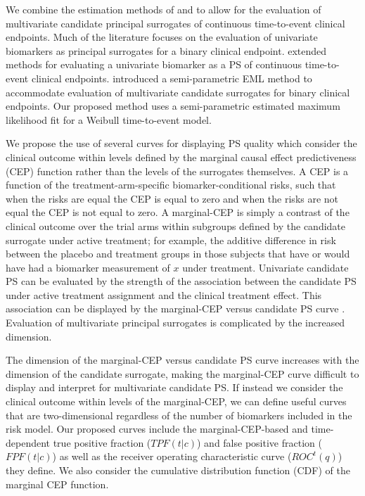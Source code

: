 \documentclass[times, doublespace]{simauth}
\begin{document}
We combine the estimation methods of \citet{Gabriel13} and  \citet{Huang11}  to allow for the evaluation of multivariate candidate principal surrogates of continuous time-to-event clinical endpoints. Much of the literature focuses on the evaluation of univariate biomarkers as principal surrogates for a binary clinical endpoint. \citet{Gabriel13} extended methods for evaluating a univariate biomarker as a PS of continuous time-to-event clinical endpoints. \citet{Huang11} introduced a semi-parametric EML method to accommodate evaluation of multivariate candidate surrogates for binary clinical endpoints.  Our proposed method uses a semi-parametric estimated maximum likelihood fit for a Weibull time-to-event model. 

We propose the use of several curves for displaying PS quality which consider the clinical outcome within levels defined by the marginal causal effect predictiveness (CEP) function rather than the levels of the surrogates themselves. A CEP is a function of the treatment-arm-specific biomarker-conditional risks, such that when the risks are equal the CEP is equal to zero and when the risks are not equal the CEP is not equal to zero. A marginal-CEP is simply a contrast of the clinical outcome over the trial arms within subgroups defined by the candidate surrogate under active treatment; for example, the additive difference in risk between the placebo and treatment groups in those subjects that have or would have had a biomarker measurement of $x$ under treatment. Univariate candidate PS can be evaluated by the strength of the association between the candidate PS under active treatment assignment and the clinical treatment effect. This association can be displayed by the marginal-CEP versus candidate PS curve \citep{Gilbert08}. Evaluation of multivariate principal surrogates is complicated by the increased dimension.  


The dimension of the marginal-CEP versus candidate PS curve increases with the dimension of the candidate surrogate, making the marginal-CEP curve difficult to display and interpret for multivariate candidate PS. If instead we consider the clinical outcome within levels of the marginal-CEP, we can define useful curves that are two-dimensional regardless of the number of biomarkers included in the risk model. Our proposed curves include the marginal-CEP-based and time-dependent true positive fraction ($TPF(t|c)$) and false positive fraction ($FPF(t|c)$) as well as the receiver operating characteristic curve ($ROC^{t}(q)$) they define. We also consider the cumulative distribution function (CDF) of the marginal CEP function. 
\end{document}
